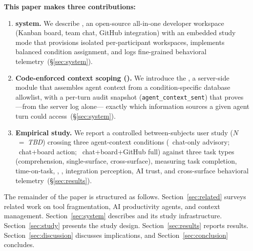 \textbf{This paper makes three contributions:}
\begin{enumerate}
  \item \textbf{\Weld system.} We describe \Weld, an open-source all-in-one
    developer workspace (Kanban board, team chat, GitHub integration) with an
    embedded study mode that provisions isolated per-participant workspaces,
    implements balanced condition assignment, and logs fine-grained behavioral
    telemetry~(\S\ref{sec:system}).

  \item \textbf{Code-enforced context scoping (\ContextGate).} We introduce the
    \ContextGate, a server-side module that assembles agent context from a
    condition-specific database allowlist, with a per-turn audit snapshot
    (\texttt{agent\_context\_sent}) that proves---from the server log alone---
    exactly which information sources a given agent turn could
    access~(\S\ref{sec:system}).

  \item \textbf{Empirical study.} We report a controlled between-subjects user
    study ($N$~=~\emph{TBD}) crossing three agent-context conditions (\CI\
    chat-only advisory; \CII\ chat+board action; \CIII\ chat+board+GitHub full)
    against three task types (comprehension, single-surface, cross-surface),
    measuring task completion, time-on-task, \NASATLX, \SUS, integration
    perception, AI trust, and cross-surface behavioral telemetry~(\S\ref{sec:results}).
\end{enumerate}

The remainder of the paper is structured as follows.
Section~\ref{sec:related} surveys related work on tool fragmentation, AI
productivity agents, and context management.
Section~\ref{sec:system} describes \Weld and its study infrastructure.
Section~\ref{sec:study} presents the study design.
Section~\ref{sec:results} reports results.
Section~\ref{sec:discussion} discusses implications, and
Section~\ref{sec:conclusion} concludes.
